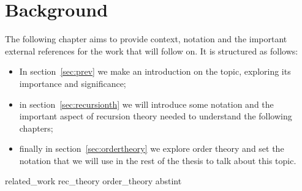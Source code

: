 \chapter{Background}

The following chapter aims to provide context, notation and the
important external references for the work that will follow on. It is
structured as follows:

\begin{itemize}
\item In section~\ref{sec:prev} we make an introduction on the topic,
  exploring its importance and significance;
\item in section~\ref{sec:recursionth} we will introduce some notation
  and the important aspect of recursion theory needed to understand the
  following chapters;
\item finally in section~\ref{sec:ordertheory} we explore order theory
  and set the notation that we will use in the rest of the thesis to
  talk about this topic.
\end{itemize}

{related_work}
{rec_theory}
{order_theory}
{abstint}
